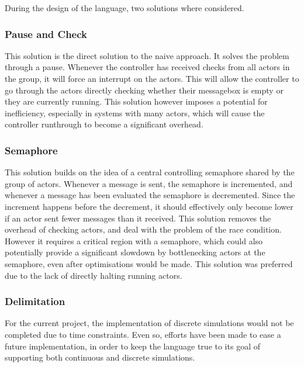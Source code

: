 During the design of the language, two solutions where considered.

\subsubsection{Pause and Check}

This solution is the direct solution to the naive approach. It solves the problem through a pause. Whenever the controller has received checks from all actors in the group, it will force an interrupt on the actors. This will allow the controller to go through the actors directly checking whether their messagebox is empty or they are currently running. This solution however imposes a potential for inefficiency, especially in systems with many actors, which will cause the controller runthrough to become a significant overhead.

\subsubsection{Semaphore}

This solution builds on the idea of a central controlling semaphore shared by the group of actors. Whenever a message is sent, the semaphore is incremented, and whenever a message has been evaluated the semaphore is decremented. Since the increment happens before the decrement, it should effectively only become lower if an actor sent fewer messages than it received. This solution removes the overhead of checking actors, and deal with the problem of the race condition. However it requires a critical region with a semaphore, which could also potentially provide a significant slowdown by bottlenecking actors at the semaphore, even after optimisations would be made. This solution was preferred due to the lack of directly halting running actors.

\subsubsection{Delimitation}

For the current project, the implementation of discrete simulations would not be completed due to time constraints. Even so, efforts have been made to ease a future implementation, in order to keep the language true to its goal of supporting both continuous and discrete simulations.